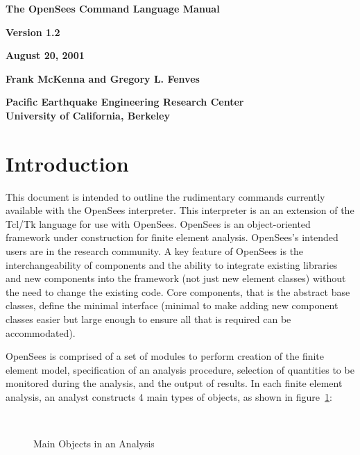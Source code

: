 \documentclass[12pt]{article}
\begin{document}


\begin{center}
{\bf \Large The OpenSees Command Language Manual} 

{\bf Version 1.2} 

{\bf  August 20, 2001} 

{\bf  Frank McKenna and Gregory L. Fenves} 

{\bf  Pacific Earthquake Engineering Research Center \\
      University of California, Berkeley}
\end{center}

\vspace{.2in}
\section{Introduction}
This document is intended to outline the rudimentary commands
currently available with the OpenSees interpreter. This interpreter
is an an extension of the Tcl/Tk language for use with OpenSees. OpenSees 
is an object-oriented framework under construction for 
finite element analysis. OpenSees's intended users are in the research
community. A key feature of OpenSees is the interchangeability of components
and the ability to integrate existing libraries and new components
into the framework (not just new element classes) without the need to
change the existing code. Core components, that is the abstract base
classes, define the minimal interface (minimal to make adding new
component classes easier but large enough to ensure all that is
required can be accommodated). 

OpenSees is comprised of a set of modules to perform creation of the finite 
element model, specification of an analysis procedure, selection
of quantities to be monitored during the analysis, and the output of
results. In each finite element analysis, an analyst constructs 4 main
types of objects, as shown in figure~\ref{main}:


\begin{figure}[htpb]
\begin{center}
\leavevmode
\hbox{%
}
\end{center}
\caption{Main Objects in an Analysis}
\label{main}
\end{figure}
\end{document}
